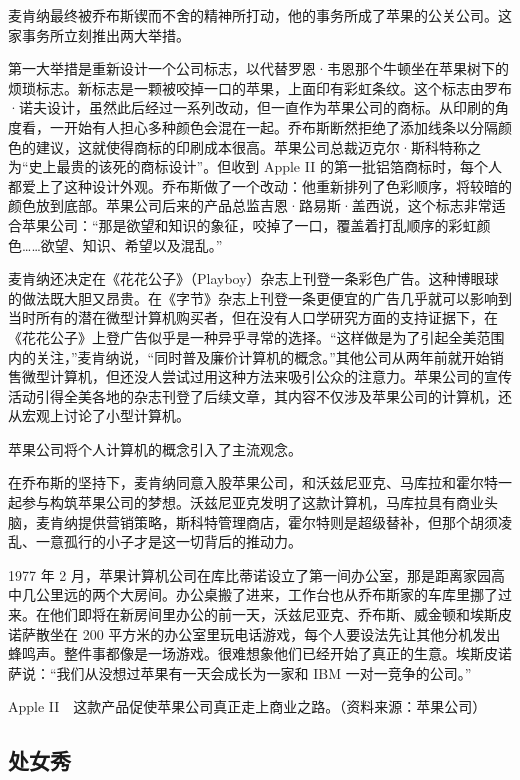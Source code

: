 \documentclass[12pt,UTF8]{ctexbook}
\begin{document}
麦肯纳最终被乔布斯锲而不舍的精神所打动，他的事务所成了苹果的公关公司。这家事务所立刻推出两大举措。

第一大举措是重新设计一个公司标志，以代替罗恩·韦恩那个牛顿坐在苹果树下的烦琐标志。新标志是一颗被咬掉一口的苹果，上面印有彩虹条纹。这个标志由罗布·诺夫设计，虽然此后经过一系列改动，但一直作为苹果公司的商标。从印刷的角度看，一开始有人担心多种颜色会混在一起。乔布斯断然拒绝了添加线条以分隔颜色的建议，这就使得商标的印刷成本很高。苹果公司总裁迈克尔·斯科特称之为“史上最贵的该死的商标设计”。但收到 Apple II 的第一批铝箔商标时，每个人都爱上了这种设计外观。乔布斯做了一个改动：他重新排列了色彩顺序，将较暗的颜色放到底部。苹果公司后来的产品总监吉恩·路易斯·盖西说，这个标志非常适合苹果公司：“那是欲望和知识的象征，咬掉了一口，覆盖着打乱顺序的彩虹颜色……欲望、知识、希望以及混乱。”

麦肯纳还决定在《花花公子》（Playboy）杂志上刊登一条彩色广告。这种博眼球的做法既大胆又昂贵。在《字节》杂志上刊登一条更便宜的广告几乎就可以影响到当时所有的潜在微型计算机购买者，但在没有人口学研究方面的支持证据下，在《花花公子》上登广告似乎是一种异乎寻常的选择。“这样做是为了引起全美范围内的关注，”麦肯纳说，“同时普及廉价计算机的概念。”其他公司从两年前就开始销售微型计算机，但还没人尝试过用这种方法来吸引公众的注意力。苹果公司的宣传活动引得全美各地的杂志刊登了后续文章，其内容不仅涉及苹果公司的计算机，还从宏观上讨论了小型计算机。

苹果公司将个人计算机的概念引入了主流观念。

在乔布斯的坚持下，麦肯纳同意入股苹果公司，和沃兹尼亚克、马库拉和霍尔特一起参与构筑苹果公司的梦想。沃兹尼亚克发明了这款计算机，马库拉具有商业头脑，麦肯纳提供营销策略，斯科特管理商店，霍尔特则是超级替补，但那个胡须凌乱、一意孤行的小子才是这一切背后的推动力。

1977 年 2 月，苹果计算机公司在库比蒂诺设立了第一间办公室，那是距离家园高中几公里远的两个大房间。办公桌搬了进来，工作台也从乔布斯家的车库里挪了过来。在他们即将在新房间里办公的前一天，沃兹尼亚克、乔布斯、威金顿和埃斯皮诺萨散坐在 200 平方米的办公室里玩电话游戏，每个人要设法先让其他分机发出蜂鸣声。整件事都像是一场游戏。很难想象他们已经开始了真正的生意。埃斯皮诺萨说：“我们从没想过苹果有一天会成长为一家和 IBM 一对一竞争的公司。”



Apple II　这款产品促使苹果公司真正走上商业之路。（资料来源：苹果公司）





\subsection{处女秀}
\end{document}
